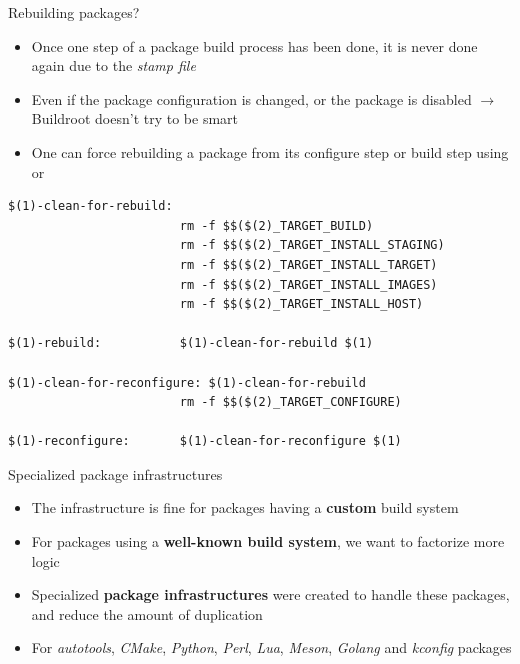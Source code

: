 \begin{frame}[fragile]{Rebuilding packages?}
  \begin{itemize}
  \item Once one step of a package build process has been done, it is
    never done again due to the {\em stamp file}
  \item Even if the package configuration is changed, or the package
    is disabled $\rightarrow$ Buildroot doesn't try to be smart
  \item One can force rebuilding a package from its configure step or
    build step using  or 
  \end{itemize}
  \begin{block}{}
    \begin{verbatim}
$(1)-clean-for-rebuild:
                        rm -f $$($(2)_TARGET_BUILD)
                        rm -f $$($(2)_TARGET_INSTALL_STAGING)
                        rm -f $$($(2)_TARGET_INSTALL_TARGET)
                        rm -f $$($(2)_TARGET_INSTALL_IMAGES)
                        rm -f $$($(2)_TARGET_INSTALL_HOST)

$(1)-rebuild:           $(1)-clean-for-rebuild $(1)

$(1)-clean-for-reconfigure: $(1)-clean-for-rebuild
                        rm -f $$($(2)_TARGET_CONFIGURE)

$(1)-reconfigure:       $(1)-clean-for-reconfigure $(1)
\end{verbatim}
\end{block}
\end{frame}

\begin{frame}{Specialized package infrastructures}
  \begin{itemize}
  \item The  infrastructure is fine for packages
    having a {\bf custom} build system
  \item For packages using a {\bf well-known build system}, we want
    to factorize more logic
  \item Specialized {\bf package infrastructures} were created to
    handle these packages, and reduce the amount of duplication
  \item For {\em autotools}, {\em CMake}, {\em Python}, {\em Perl},
    {\em Lua}, {\em Meson}, {\em Golang} and {\em kconfig} packages
  \end{itemize}
\end{frame}

